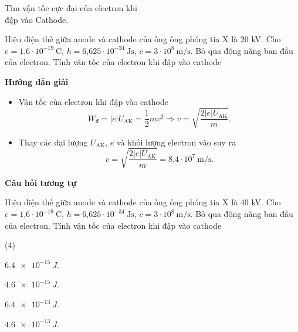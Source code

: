 \begin{dang}{Tìm vận tốc cực đại của electron khi\\ đập vào Cathode.}


{
Hiệu điện thế giữa anode và cathode của ống ống phóng tia X là  20 kV. Cho $e=\text{1,6}\cdot 10^{-19}\ \text{C}$, $h=\text{6,625} \cdot 10^{-34}\ \text{Js}$, $c=3\cdot 10^8\ \text{m/s}$. Bỏ qua động năng ban đầu của electron. Tính vận tốc của electron khi đập vào cathode
}
{\begin{center}
	\textbf{Hướng dẫn giải}
\end{center}
\begin{itemize}
	\item Vận tốc của electron khi đập vào cathode
	\begin{equation*} W_{\text{đ}}=|e|U_{\text{AK}}=\dfrac{1}{2}mv^2 \Rightarrow v =\sqrt {\dfrac{2|e|U_{\text{AK}}}{m}}.
	\end{equation*}
	\item Thay các đại lượng $U_{\text{AK}}$, $e$ và khối lượng electron vào suy ra
	\begin{equation*}
	v =\sqrt {\dfrac{2|e|U_{\text{AK}}}{m}} = \text{8,4} \cdot 10^7 \ \text{m/s}.
	\end{equation*}
\end{itemize}

\begin{center}
\textbf{Câu hỏi tương tự}
\end{center}

Hiệu điện thế giữa anode và cathode của ống ống phóng tia X là  40 kV. Cho $e=\text{1,6}\cdot 10^{-19}\ \text{C}$, $h=\text{6,625} \cdot 10^{-34}\ \text{Js}$, $c=3\cdot 10^8\ \text{m/s}$. Bỏ qua động năng ban đầu của electron. Tính vận tốc của electron khi đập vào cathode
\begin{mcq}(4)
	\item $ \SI{6,4 e-15}{J} $.
	\item $ \SI{4,6 e-15}{J} $.
	\item $ \SI{6,4 e-13}{J} $.
	\item $ \SI{4,6 e-13}{J} $.
\end{mcq}

}
\end{dang}
